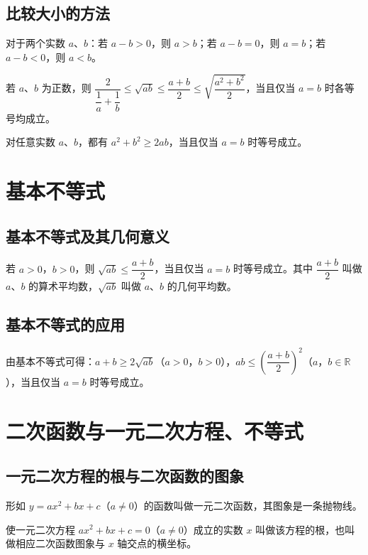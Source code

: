 \subsection{比较大小的方法}
\begin{definition}[作差法比较大小]
对于两个实数 $a$、$b$：若 $a-b>0$，则 $a>b$；若 $a-b=0$，则 $a=b$；若 $a-b<0$，则 $a<b$。
\end{definition}
\begin{theorem}[基本不等式的等价形式]
若 $a$、$b$ 为正数，则 $\dfrac{2}{\dfrac{1}{a}+\dfrac{1}{b}} \leq \sqrt{ab} \leq \dfrac{a+b}{2} \leq \sqrt{\dfrac{a^2+b^2}{2}}$，当且仅当 $a=b$ 时各等号均成立。
\end{theorem}
\begin{corollary}[重要不等式]
对任意实数 $a$、$b$，都有 $a^2+b^2 \geq 2ab$，当且仅当 $a=b$ 时等号成立。
\end{corollary}

\section{基本不等式}
\subsection{基本不等式及其几何意义}
\begin{definition}[基本不等式]
若 $a>0$，$b>0$，则 $\sqrt{ab} \leq \dfrac{a+b}{2}$，当且仅当 $a=b$ 时等号成立。其中 $\dfrac{a+b}{2}$ 叫做 $a$、$b$ 的算术平均数，$\sqrt{ab}$ 叫做 $a$、$b$ 的几何平均数。
\end{definition}
\subsection{基本不等式的应用}
\begin{definition}[基本不等式的常用变形]
由基本不等式可得：$a+b \geq 2\sqrt{ab}$（$a>0$，$b>0$），$ab \leq \left(\dfrac{a+b}{2}\right)^2$（$a$，$b \in \mathbb{R}$），当且仅当 $a=b$ 时等号成立。
\end{definition}

\section{二次函数与一元二次方程、不等式}
\subsection{一元二次方程的根与二次函数的图象}
\begin{definition}[一元二次函数]
形如 $y=ax^2+bx+c$（$a \neq 0$）的函数叫做一元二次函数，其图象是一条抛物线。
\end{definition}
\begin{definition}[一元二次方程的根]
使一元二次方程 $ax^2+bx+c=0$（$a \neq 0$）成立的实数 $x$ 叫做该方程的根，也叫做相应二次函数图象与 $x$ 轴交点的横坐标。
\end{definition}
